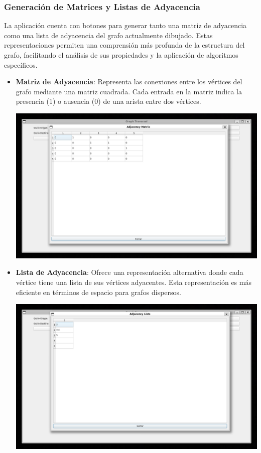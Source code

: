 \documentclass[conference]{IEEEtran}
\begin{document}
\subsubsection{\textbf{Generación de Matrices y Listas de Adyacencia}}
La aplicación cuenta con botones para generar tanto una matriz de adyacencia como una lista de adyacencia del grafo actualmente dibujado. Estas representaciones permiten una comprensión más profunda de la estructura del grafo, facilitando el análisis de sus propiedades y la aplicación de algoritmos específicos.\\
\begin{itemize}
    \item \textbf{Matriz de Adyacencia}: Representa las conexiones entre los vértices del grafo mediante una matriz cuadrada. Cada entrada en la matriz indica la presencia (1) o ausencia (0) de una arista entre dos vértices.
        \begin{center}
            \includegraphics[width=\linewidth]{img/AdjencyMatrix.png}
        \end{center}
    \item \textbf{Lista de Adyacencia}: Ofrece una representación alternativa donde cada vértice tiene una lista de sus vértices adyacentes. Esta representación es más eficiente en términos de espacio para grafos dispersos.
        \begin{center}
            \includegraphics[width=\linewidth]{img/AdjencyLists.png}
        \end{center}
\end{itemize}
\end{document}

